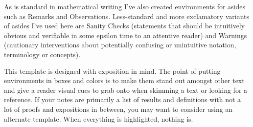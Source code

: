 \documentclass[12pt,x11names]{article}
\begin{document}
\begin{remark}
As is standard in mathematical writing I've also created environments for asides such as Remarks and Observations. Less-standard and more exclamatory variants of asides I've used here are Sanity Checks (statements that should be intuitively obvious and verifiable in some epsilon time to an attentive reader) and Warnings (cautionary interventions about potentially confusing or unintuitive notation, terminology or concepts).
\end{remark}

\begin{warning}
    This template is designed with exposition in mind. The point of putting environments in boxes and colors is to make them stand out amongst other text and give a reader visual cues to grab onto when skimming a text or looking for a reference. If your notes are primarily a list of results and definitions with not a lot of proofs and expositions in between, you may want to consider using an alternate template. When everything is highlighted, nothing is.
\end{warning}

\printbibliography

 
\end{document}
